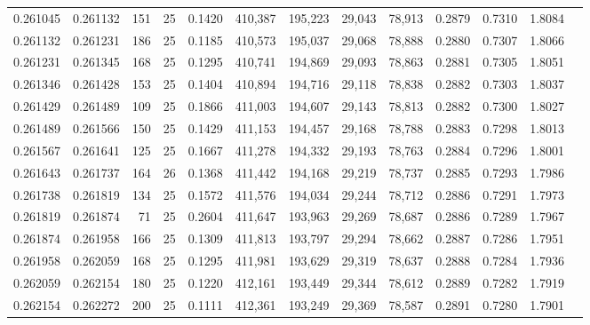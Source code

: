 \begin{tabular}{rrrrrrrrrrrrr}
0.261045 & 0.261132 &   151 &  25 &                                     0.1420 & 410,387 & 195,223 &  29,043 &  78,913 & 0.2879 & 0.7310 & 1.8084 \\
0.261132 & 0.261231 &   186 &  25 &                                     0.1185 & 410,573 & 195,037 &  29,068 &  78,888 & 0.2880 & 0.7307 & 1.8066 \\
0.261231 & 0.261345 &   168 &  25 &                                     0.1295 & 410,741 & 194,869 &  29,093 &  78,863 & 0.2881 & 0.7305 & 1.8051 \\
0.261346 & 0.261428 &   153 &  25 &                                     0.1404 & 410,894 & 194,716 &  29,118 &  78,838 & 0.2882 & 0.7303 & 1.8037 \\
0.261429 & 0.261489 &   109 &  25 &                                     0.1866 & 411,003 & 194,607 &  29,143 &  78,813 & 0.2882 & 0.7300 & 1.8027 \\
0.261489 & 0.261566 &   150 &  25 &                                     0.1429 & 411,153 & 194,457 &  29,168 &  78,788 & 0.2883 & 0.7298 & 1.8013 \\
0.261567 & 0.261641 &   125 &  25 &                                     0.1667 & 411,278 & 194,332 &  29,193 &  78,763 & 0.2884 & 0.7296 & 1.8001 \\
0.261643 & 0.261737 &   164 &  26 &                                     0.1368 & 411,442 & 194,168 &  29,219 &  78,737 & 0.2885 & 0.7293 & 1.7986 \\
0.261738 & 0.261819 &   134 &  25 &                                     0.1572 & 411,576 & 194,034 &  29,244 &  78,712 & 0.2886 & 0.7291 & 1.7973 \\
0.261819 & 0.261874 &    71 &  25 &                                     0.2604 & 411,647 & 193,963 &  29,269 &  78,687 & 0.2886 & 0.7289 & 1.7967 \\
0.261874 & 0.261958 &   166 &  25 &                                     0.1309 & 411,813 & 193,797 &  29,294 &  78,662 & 0.2887 & 0.7286 & 1.7951 \\
0.261958 & 0.262059 &   168 &  25 &                                     0.1295 & 411,981 & 193,629 &  29,319 &  78,637 & 0.2888 & 0.7284 & 1.7936 \\
0.262059 & 0.262154 &   180 &  25 &                                     0.1220 & 412,161 & 193,449 &  29,344 &  78,612 & 0.2889 & 0.7282 & 1.7919 \\
0.262154 & 0.262272 &   200 &  25 &                                     0.1111 & 412,361 & 193,249 &  29,369 &  78,587 & 0.2891 & 0.7280 & 1.7901 \\

\end{tabular}
